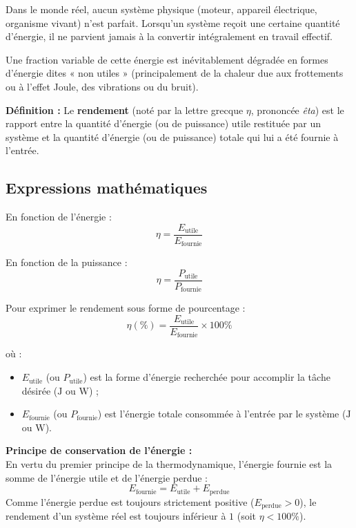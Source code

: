 \documentclass[11pt,openany]{book}
\begin{document}
Dans le monde réel, aucun système physique (moteur, appareil électrique, organisme vivant) n'est parfait. Lorsqu'un système reçoit une certaine quantité d'énergie, il ne parvient jamais à la convertir intégralement en travail effectif. 

Une fraction variable de cette énergie est inévitablement dégradée en formes d'énergie dites « non utiles » (principalement de la chaleur due aux frottements ou à l'effet Joule, des vibrations ou du bruit).

\vspace{0.2cm}

\noindent\textbf{Définition :} Le \textbf{rendement} (noté par la lettre grecque $\eta$, prononcée \textit{êta}) est le rapport entre la quantité d'énergie (ou de puissance) utile restituée par un système et la quantité d'énergie (ou de puissance) totale qui lui a été fournie à l'entrée.

\vspace{0.3cm}

\subsection*{Expressions mathématiques}

En fonction de l'énergie :
\[
\boxed{\eta = \frac{E_{\mathrm{utile}}}{E_{\mathrm{fournie}}}}
\]

En fonction de la puissance :
\[
\boxed{\eta = \frac{P_{\mathrm{utile}}}{P_{\mathrm{fournie}}}}
\]

Pour exprimer le rendement sous forme de pourcentage :
\[
\boxed{\eta(\%) = \frac{E_{\mathrm{utile}}}{E_{\mathrm{fournie}}} \times 100\%}
\]

où :
\begin{itemize}
    \item $E_{\mathrm{utile}}$ (ou $P_{\mathrm{utile}}$) est la forme d'énergie recherchée pour accomplir la tâche désirée ($\mathrm{J}$ ou $\mathrm{W}$) ;
    \item $E_{\mathrm{fournie}}$ (ou $P_{\mathrm{fournie}}$) est l'énergie totale consommée à l'entrée par le système ($\mathrm{J}$ ou $\mathrm{W}$).
\end{itemize}

\vspace{0.2cm}

\noindent\textbf{Principe de conservation de l'énergie :} \\
En vertu du premier principe de la thermodynamique, l'énergie fournie est la somme de l'énergie utile et de l'énergie perdue :
\[
E_{\mathrm{fournie}} = E_{\mathrm{utile}} + E_{\mathrm{perdue}}
\]
Comme l'énergie perdue est toujours strictement positive ($E_{\mathrm{perdue}} > 0$), le rendement d'un système réel est toujours inférieur à $1$ (soit $\eta < 100\%$).
\end{document}
